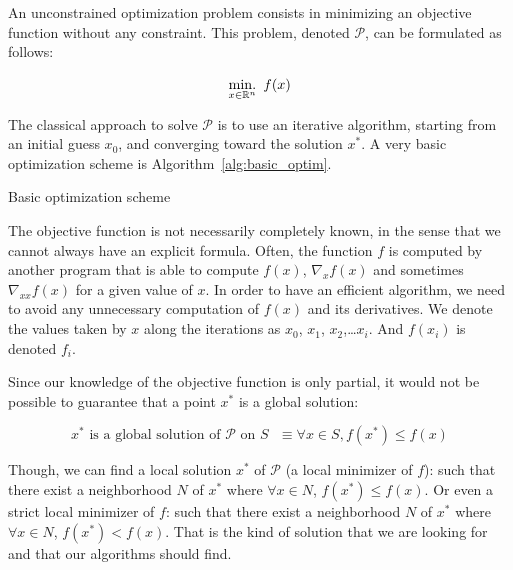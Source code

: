 An unconstrained optimization problem consists in minimizing an objective function without any constraint.
This problem, denoted $\mathcal{P}$, can be formulated as follows:

\begin{equation}
  \operatorname*{min.}_{x\in\mathbb{R}^n}\ {f(x)}
\label{eq:unconstrainedOptim}
\end{equation}

The classical approach to solve $\mathcal{P}$ is to use an iterative algorithm, starting from an initial guess $x_0$, and converging toward the solution $x^*$.
A very basic optimization scheme is Algorithm~\ref{alg:basic_optim}.

\begin{algorithm}
\begin{algorithmic}
  \EndWhile{}
  \caption{Basic optimization scheme}
\label{alg:basic_optim}
\end{algorithmic}
\end{algorithm}

The objective function is not necessarily completely known, in the sense that we cannot always have an explicit formula. Often, the function $f$ is computed by another program that is able to compute $f(x)$, $\nabla_x f(x)$ and sometimes $\nabla_{xx} f(x)$ for a given value of $x$.
In order to have an efficient algorithm, we need to avoid any unnecessary computation of $f(x)$ and its derivatives.
We denote the values taken by $x$ along the iterations as $x_0$, $x_1$, $x_2$,\ldots $x_i$.
And $f(x_i)$ is denoted $f_i$.

Since our knowledge of the objective function is only partial, it would not be possible to guarantee that a point $x^*$ is a global solution:

\begin{equation}
  \text{$x^*$ is a global solution of $\mathcal{P}$ on $\mathit{S}$ } \equiv \forall x \in \mathit{S}, f(x^*) \leq f(x)
\end{equation}

Though, we can find a local solution $x^*$ of $\mathcal{P}$ (a local minimizer of $f$): such that there exist a neighborhood $\mathit{N}$ of $x^*$ where $\forall x\in \mathit{N}$, $f(x^*) \leq f(x)$.
Or even a strict local minimizer of $f$: such that there exist a neighborhood $\mathit{N}$ of $x^*$ where $\forall x\in \mathit{N}$, $f(x^*) < f(x)$.
That is the kind of solution that we are looking for and that our algorithms should find.

